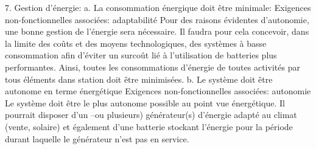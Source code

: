 7. Gestion d'énergie:
a. La consommation énergique doit être minimale:
 Exigences non-fonctionnelles associées: adaptabilité 
Pour des raisons évidentes d'autonomie,  une bonne gestion de l'énergie sera nécessaire. Il faudra pour cela concevoir, dans la limite des coûts et des moyens technologiques, des systèmes à basse consommation afin d'éviter un surcoût lié à l'utilisation de batteries plus performantes. Ainsi, toutes les consommations d’énergie de toutes activités par tous éléments dans station doit être minimisées.  
b. Le système doit être autonome en terme énergétique 
Exigences non-fonctionnelles associées: autonomie
Le système doit être le plus autonome possible au point vue énergétique. Il pourrait disposer d’un –ou plusieurs) générateur(s) d’énergie adapté au climat (vente, solaire) et également d’une batterie stockant l'énergie pour la période durant laquelle le générateur n'est pas en service. 

